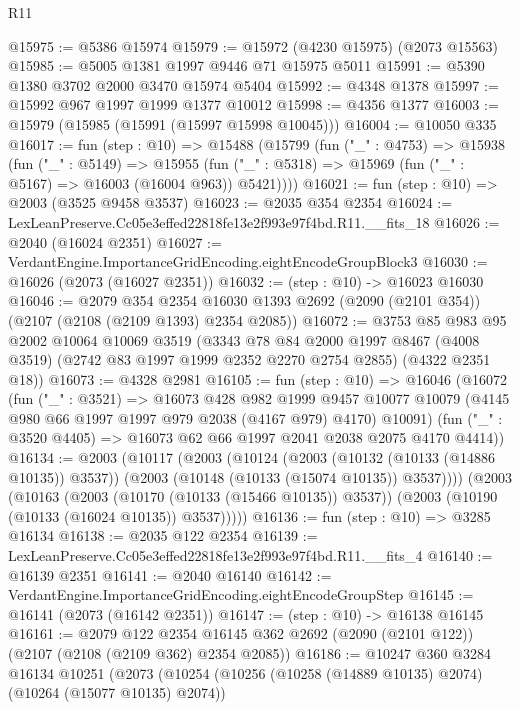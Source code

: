 \begin{lexlean}{R11}
\begin{coremodule}
@15975 := @5386 @15974
@15979 := @15972 (@4230 @15975) (@2073 @15563)
@15985 := @5005 @1381 @1997 @9446 @71 @15975 @5011
@15991 := @5390 @1380 @3702 @2000 @3470 @15974 @5404
@15992 := @4348 @1378
@15997 := @15992 @967 @1997 @1999 @1377 @10012
@15998 := @4356 @1377
@16003 := @15979 (@15985 (@15991 (@15997 @15998 @10045)))
@16004 := @10050 @335
@16017 := fun (step : @10) =>
  @15488
    (@15799
      (fun ("_" : @4753) =>
      @15938
        (fun ("_" : @5149) =>
        @15955 (fun ("_" : @5318) => @15969 (fun ("_" : @5167) => @16003 (@16004 @963)) @5421))))
@16021 := fun (step : @10) => @2003 (@3525 @9458 @3537)
@16023 := @2035 @354 @2354
@16024 := LexLeanPreserve.Cc05e3effed22818fe13e2f993e97f4bd.R11.__fits_18
@16026 := @2040 (@16024 @2351)
@16027 := VerdantEngine.ImportanceGridEncoding.eightEncodeGroupBlock3
@16030 := @16026 (@2073 (@16027 @2351))
@16032 := (step : @10) -> @16023 @16030
@16046 := @2079
    @354
    @2354
    @16030
    @1393
    @2692
    (@2090 (@2101 @354))
    (@2107 (@2108 (@2109 @1393) @2354 @2085))
@16072 := @3753
    @85
    @983
    @95
    @2002
    @10064
    @10069
    @3519
    (@3343
      @78
      @84
      @2000
      @1997
      @8467
      (@4008 @3519)
      (@2742 @83 @1997 @1999 @2352 @2270 @2754 @2855)
      (@4322 @2351 @18))
@16073 := @4328 @2981
@16105 := fun (step : @10) =>
  @16046
    (@16072
      (fun ("_" : @3521) =>
      @16073
        @428
        @982
        @1999
        @9457
        @10077
        @10079
        (@4145 @980 @66 @1997 @1997 @979 @2038 (@4167 @979) @4170)
        @10091)
      (fun ("_" : @3520 @4405) => @16073 @62 @66 @1997 @2041 @2038 @2075 @4170 @4414))
@16134 := @2003
    (@10117
      (@2003
        (@10124
          (@2003 (@10132 (@10133 (@14886 @10135)) @3537))
          (@2003 (@10148 (@10133 (@15074 @10135)) @3537))))
      (@2003
        (@10163
          (@2003 (@10170 (@10133 (@15466 @10135)) @3537))
          (@2003 (@10190 (@10133 (@16024 @10135)) @3537)))))
@16136 := fun (step : @10) => @3285 @16134
@16138 := @2035 @122 @2354
@16139 := LexLeanPreserve.Cc05e3effed22818fe13e2f993e97f4bd.R11.__fits_4
@16140 := @16139 @2351
@16141 := @2040 @16140
@16142 := VerdantEngine.ImportanceGridEncoding.eightEncodeGroupStep
@16145 := @16141 (@2073 (@16142 @2351))
@16147 := (step : @10) -> @16138 @16145
@16161 := @2079
    @122
    @2354
    @16145
    @362
    @2692
    (@2090 (@2101 @122))
    (@2107 (@2108 (@2109 @362) @2354 @2085))
@16186 := @10247
    @360
    @3284
    @16134
    @10251
    (@2073
      (@10254
        (@10256 (@10258 (@14889 @10135) @2074) (@10264 (@15077 @10135) @2074))

\end{coremodule}
\end{lexlean}
